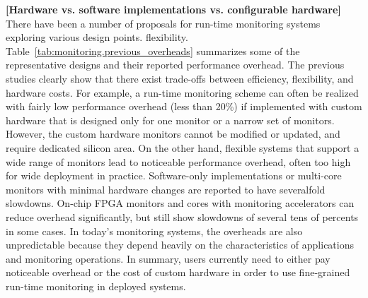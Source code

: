 \textbf{[Hardware vs. software implementations vs. configurable hardware]}
There have been a number of proposals for run-time monitoring systems exploring
various design points. %
flexibility.  Table~\ref{tab:monitoring.previous_overheads} summarizes some of
the representative designs and their reported performance overhead. The
previous studies clearly show that there exist trade-offs between efficiency,
flexibility, and hardware costs.  For example, a run-time monitoring scheme can
often be realized with fairly low performance overhead (less than 20\%) if
implemented with custom hardware that is designed only for one monitor or a
narrow set of monitors. However, the custom hardware monitors cannot be
modified or updated, and require dedicated silicon area.  On the other hand,
flexible systems that support a wide range of monitors lead to noticeable
performance overhead, often too high for wide deployment in practice.
Software-only implementations \cite{nagarajan-interact08, lift-micro06,
purify-usenix92, taintcheck-ndsss05} or multi-core monitors with minimal
hardware changes \cite{lba-asid06} are reported to have severalfold slowdowns.
On-chip FPGA monitors \cite{flexcore-micro10} and cores with monitoring
accelerators \cite{lba-isca08, fade-hpca14} can reduce overhead significantly,
but still show slowdowns of several tens of percents in some cases.  In today's
monitoring systems, the overheads are also unpredictable because they depend
heavily on the characteristics of applications and monitoring operations.  In
summary, users currently need to either pay noticeable overhead or the cost of
custom hardware in order to use fine-grained run-time monitoring in deployed
systems.

